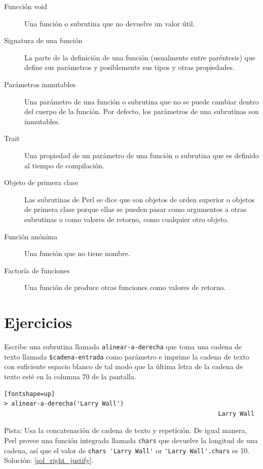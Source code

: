 \begin{description}
\item[Funcción void] Una función o subrutina que no devuelve
un valor útil.

\item[Signatura de una función] La parte de la definición de 
una función (usualmente entre paréntesis) que define 
sus parámetros y posiblemente sus tipos y otras propiedades.

\item[Parámetros inmutables] Una parámetro de una función
o subrutina que no se puede cambiar dentro del cuerpo de
la función. Por defecto, los parámetros de una
subrutinas son inmutables.

\item[Trait] Una propiedad de un parámetro de una función
o subrutina que es definido al tiempo de compilación.

\item[Objeto de primera clase] Las subrutinas de Perl se
dice que son objetos de orden superior o objetos de primera 
clase porque ellas se pueden pasar como argumentos a 
otras subrutinas o como valores de retorno, como cualquier
otro objeto.

\item[Función anónima] Una función que no tiene nombre.

\item[Factoría de funciones] Una función de produce otras 
funciones como valores de retorno.

\end{description}


\section{Ejercicios}

\begin{exercise}
\label{right_justify}

Escribe una subrutina llamada \verb|alinear-a-derecha| 
que toma una cadena de texto llamada {\tt \$cadena-entrada}
como parámetro e imprime la cadena de texto con suficiente
espacio blanco de tal modo que la última letra de la cadena
de texto esté en la columna 70 de la pantalla.

\begin{verbatim}[fontshape=up]
> alinear-a-derecha('Larry Wall')
                                                           Larry Wall
\end{verbatim}

Pista: Usa la concatenación de cadena de texto y repetición. 
De igual manera, Perl provee una función integrada llamada 
{\tt chars} que devuelve la longitud de una cadena, así que
el valor de \verb"chars 'Larry Wall'" or \verb"'Larry Wall'.chars"
es 10. Solución: \ref{sol_right_justify}.

\end{exercise}


